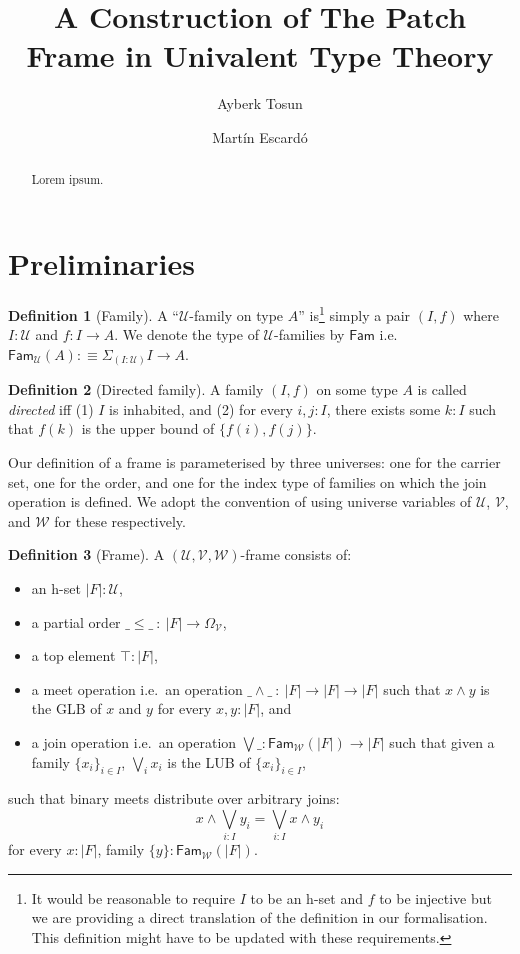 \documentclass[a4paper, 11pt]{article}
\title{A Construction of The Patch Frame in Univalent Type Theory}
\author{Ayberk Tosun \and Mart\'{i}n Escard\'{o}}
\theoremstyle{definition}
\newtheorem{defn}{Definition}
\newcommand{\UU}{\mathcal{U}}
\newcommand{\VV}{\mathcal{V}}
\newcommand{\WW}{\mathcal{W}}
\begin{document}
\maketitle

\begin{abstract}
  Lorem ipsum.
\end{abstract}

\section{Preliminaries}

\begin{defn}[Family]
  A ``$\UU$-family on type $A$'' is\footnote{%
    It would be reasonable to require $I$ to be an h-set and $f$ to be injective but we are
    providing a direct translation of the definition in our formalisation. This definition might
    have to be updated with these requirements.
  }
  simply a pair $(I, f)$ where $I : \UU$ and $f : I \rightarrow A$. We denote the type of
  $\UU$-families by $\mathsf{Fam}$ i.e.\ $\mathsf{Fam}_{\UU}(A) :\equiv \Sigma_{(I : \UU)} I \rightarrow A$.
\end{defn}

\begin{defn}[Directed family]
  A family $(I, f)$ on some type $A$ is called \emph{directed} iff (1) $I$ is inhabited, and (2) for
  every $i, j : I$, there exists some $k : I$ such that $f(k)$ is the upper bound of
  $\{ f(i), f(j) \}$.
\end{defn}

Our definition of a frame is parameterised by three universes: one for the carrier set, one for the
order, and one for the index type of families on which the join operation is defined. We adopt the
convention of using universe variables of $\UU$, $\VV$, and $\WW$ for these respectively.

\begin{defn}[Frame]
  A $(\UU, \VV, \WW)$-frame consists of:
  \begin{itemize}
    \item an h-set $| F | : \UU$,
    \item a partial order $\_\le\_\ :\ | F | \rightarrow \Omega_\VV$,
    \item a top element $\top : | F |$,
    \item a meet operation i.e.\ an operation $\_\wedge\_\ :\ | F | \rightarrow | F | \rightarrow | F |$
      such that $x \wedge y$ is the GLB of $x$ and $y$ for every $x, y : | F |$, and
    \item a join operation i.e.\ an operation $\bigvee\_ : \mathsf{Fam}_{\WW}(| F |) \rightarrow
      | F |$ such that given a family $\{ x_i \}_{i \in I}$, $\bigvee_i x_i$ is the LUB
      of $\{ x_i \}_{i \in I}$,
  \end{itemize}
  such that binary meets distribute over arbitrary joins:
  \begin{equation*}
    x \wedge \bigvee_{i : I} y_i = \bigvee_{i : I} x \wedge y_i
  \end{equation*}
  for every $x : | F |$, family $\{ y \} : \mathsf{Fam}_{\WW}(| F |)$.
\end{defn}
\end{document}
